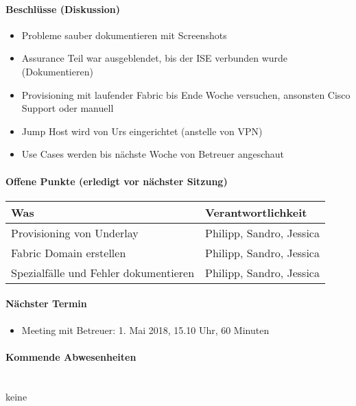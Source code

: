 \paragraph{Beschlüsse (Diskussion)}
\begin{itemize}	
	\item Probleme sauber dokumentieren mit Screenshots
	\item Assurance Teil war ausgeblendet, bis der ISE verbunden wurde (Dokumentieren)
	\item Provisioning mit laufender Fabric bis Ende Woche versuchen, ansonsten Cisco Support oder manuell
	\item Jump Host wird von Urs eingerichtet (anstelle von VPN)
	\item Use Cases werden bis nächste Woche von Betreuer angeschaut
\end{itemize}

\paragraph{Offene Punkte (erledigt vor nächster Sitzung)} \mbox{}

\begin{table}[H]
	\centering
	\begin{tabularx}{\textwidth}{X | p{4.5cm}}
		\rowcolor{gray!50}
		\textbf{Was} & \textbf{Verantwortlichkeit} \\
		\hline
		Provisioning von Underlay & Philipp, Sandro, Jessica \\	
		Fabric Domain erstellen & Philipp, Sandro, Jessica \\
		Spezialfälle und Fehler dokumentieren & Philipp, Sandro, Jessica \\
	\end{tabularx}
	\label{tab:my-label}
\end{table}

\paragraph{Nächster Termin}
\begin{itemize}	
	\item Meeting mit Betreuer: 1. Mai 2018, 15.10 Uhr, 60 Minuten
\end{itemize}

\paragraph{Kommende Abwesenheiten} \mbox{}\\
keine

